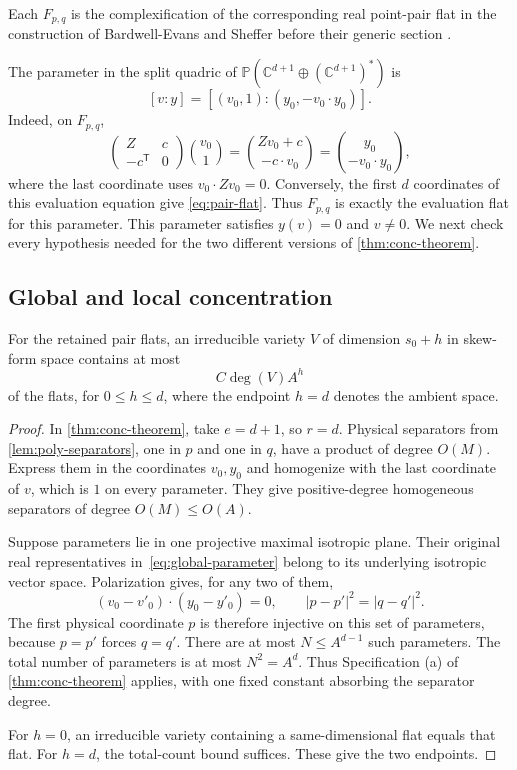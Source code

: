 Each $F_{p,q}$ is the complexification of the corresponding real point-pair flat in the construction of Bardwell-Evans and Sheffer before their generic section \cite[Theorem~6.1]{BardwellEvansSheffer2019}.

The parameter in the split quadric of $\mathbb{P}(\mathbb{C}^{d+1}\oplus(\mathbb{C}^{d+1})^*)$ is
\begin{equation}\label{eq:global-parameter}
 [v:y]=[(v_0,1):(y_0,-v_0\cdot y_0)].
\end{equation}
Indeed, on $F_{p,q}$,
\[
 \begin{pmatrix}Z&c\\-c^{\mathsf T}&0\end{pmatrix}
 \binom{v_0}{1}
 =\binom{Zv_0+c}{-c\cdot v_0}
 =\binom{y_0}{-v_0\cdot y_0},
\]
where the last coordinate uses $v_0\cdot Zv_0=0$. Conversely, the first $d$ coordinates of this evaluation equation give \eqref{eq:pair-flat}. Thus $F_{p,q}$ is exactly the evaluation flat for this parameter. This parameter satisfies $y(v)=0$ and $v\ne0$. We next check every hypothesis needed for the two different versions of \cref{thm:conc-theorem}.

\subsection{Global and local concentration}

\begin{lemma}\label{lem:red-global-concentration}
For the retained pair flats, an irreducible variety $V$ of dimension $s_0+h$ in skew-form space contains at most
\[
 C\deg(V)A^h
\]
of the flats, for $0\le h\le d$, where the endpoint $h=d$ denotes the ambient space.
\end{lemma}

\begin{proof}
In \cref{thm:conc-theorem}, take $e=d+1$, so $r=d$. Physical separators from \cref{lem:poly-separators}, one in $p$ and one in $q$, have a product of degree $O(M)$. Express them in the coordinates $v_0,y_0$ and homogenize with the last coordinate of $v$, which is $1$ on every parameter. They give positive-degree homogeneous separators of degree $O(M)\le O(A)$.

Suppose parameters lie in one projective maximal isotropic plane. Their original real representatives in~\eqref{eq:global-parameter} belong to its underlying isotropic vector space. Polarization gives, for any two of them,
\[
 (v_0-v'_0)\cdot(y_0-y'_0)=0,\qquad
 |p-p'|^2=|q-q'|^2.
\]
The first physical coordinate $p$ is therefore injective on this set of parameters, because $p=p'$ forces $q=q'$. There are at most $N\le A^{d-1}$ such parameters. The total number of parameters is at most $N^2=A^d$. Thus Specification (a) of \cref{thm:conc-theorem} applies, with one fixed constant absorbing the separator degree.

For $h=0$, an irreducible variety containing a same-dimensional flat equals that flat. For $h=d$, the total-count bound suffices. These give the two endpoints.
\end{proof}

